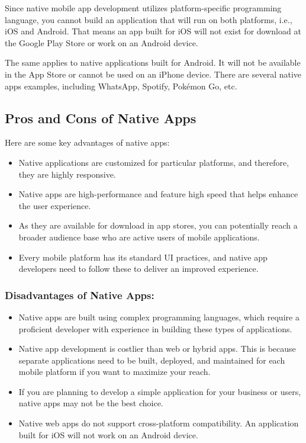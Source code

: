 \documentclass[conference]{IEEEtran}
\begin{document}
Since native mobile app development utilizes platform-specific programming language, you cannot build an application that will run on both platforms, i.e., iOS and Android. That means an app built for iOS will not exist for download at the Google Play Store or work on an Android device.

The same applies to native applications built for Android. It will not be available in the App Store or cannot be used on an iPhone device. There are several native apps examples, including WhatsApp, Spotify, Pokémon Go, etc.

\subsection{Pros and Cons of Native Apps}
Here are some key advantages of native apps:

\begin{itemize}
    \item Native applications are customized for particular platforms, and therefore, they are highly responsive.
    \item Native apps are high-performance and feature high speed that helps enhance the user experience.
    \item As they are available for download in app stores, you can potentially reach a broader audience base who are active users of mobile applications.
    \item Every mobile platform has its standard UI practices, and native app developers need to follow these to deliver an improved experience.
\end{itemize}

\subsubsection{Disadvantages of Native Apps:}
\begin{itemize}
    \item Native apps are built using complex programming languages, which require a proficient developer with experience in building these types of applications.
    \item Native app development is costlier than web or hybrid apps. This is because separate applications need to be built, deployed, and maintained for each mobile platform if you want to maximize your reach.
    \item If you are planning to develop a simple application for your business or users, native apps may not be the best choice.
    \item Native web apps do not support cross-platform compatibility. An application built for iOS will not work on an Android device.
\end{itemize}
\end{document}
